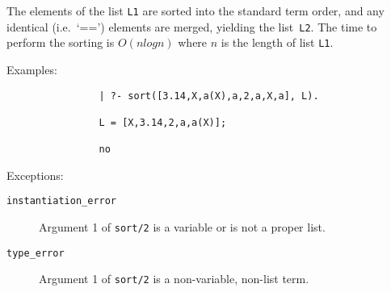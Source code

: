 \begin{description}
    The elements of the list {\tt L1} are sorted into the standard term order,
    and any identical (i.e.\ `==') elements are merged, yielding the 
    list~{\tt L2}.  The time to perform the sorting is $O(n log n)$ where 
    $n$ is the length of list {\tt L1}.  

    Examples:
    {\footnotesize
     \begin{verbatim}
                | ?- sort([3.14,X,a(X),a,2,a,X,a], L).

                L = [X,3.14,2,a,a(X)];

                no
     \end{verbatim}}
    Exceptions:
    \begin{description}
    \item[{\tt instantiation\_error}]
	Argument 1 of {\tt sort/2} is a variable or is not a proper list.
    \item[{\tt type\_error}]
	Argument 1 of {\tt sort/2} is a non-variable, non-list term.
    \end{description}


\end{description}
